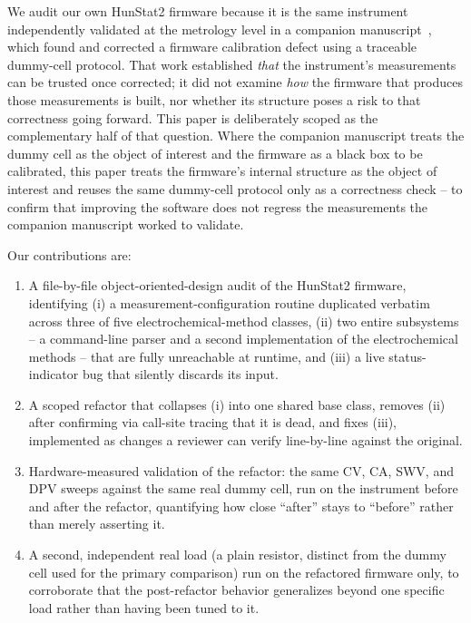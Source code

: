 We audit our own HunStat2 firmware because it is the same instrument
independently validated at the metrology level in a companion
manuscript~\cite{clement2026linearity}, which found and corrected a
firmware calibration defect using a traceable dummy-cell protocol. That
work established \emph{that} the instrument's measurements can be trusted
once corrected; it did not examine \emph{how} the firmware that produces
those measurements is built, nor whether its structure poses a risk to that
correctness going forward. This paper is deliberately scoped as the
complementary half of that question. Where the companion manuscript treats
the dummy cell as the object of interest and the firmware as a black box to
be calibrated, this paper treats the firmware's internal structure as the
object of interest and reuses the same dummy-cell protocol only as a
correctness check -- to confirm that improving the software does not
regress the measurements the companion manuscript worked to validate.

Our contributions are:
\begin{enumerate}
\item A file-by-file object-oriented-design audit of the HunStat2 firmware,
  identifying (i) a measurement-configuration routine duplicated verbatim
  across three of five electrochemical-method classes, (ii) two entire
  subsystems -- a command-line parser and a second implementation of the
  electrochemical methods -- that are fully unreachable at runtime, and
  (iii) a live status-indicator bug that silently discards its input.
\item A scoped refactor that collapses (i) into one shared base class,
  removes (ii) after confirming via call-site tracing that it is dead, and
  fixes (iii), implemented as changes a reviewer can verify line-by-line
  against the original.
\item Hardware-measured validation of the refactor: the same CV, CA, SWV,
  and DPV sweeps against the same real dummy cell, run on the instrument
  before and after the refactor, quantifying how close ``after'' stays to
  ``before'' rather than merely asserting it.
\item A second, independent real load (a plain resistor, distinct from the
  dummy cell used for the primary comparison) run on the refactored
  firmware only, to corroborate that the post-refactor behavior generalizes
  beyond one specific load rather than having been tuned to it.
\end{enumerate}
